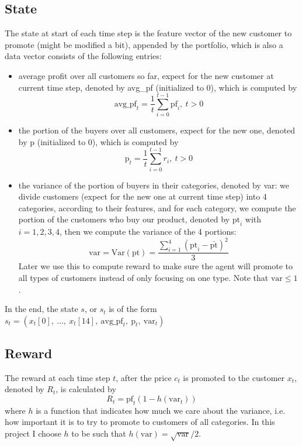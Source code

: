 \documentclass[11pt]{article}
\begin{document}
\subsection{State}
The state at start of each time step is the feature vector of the new customer 
to promote (might be modified a bit), appended by the portfolio, which is also 
a data vector consists of the following entries:
\begin{itemize}
    \item average profit over all customers so far, expect for the new customer
        at current time step, denoted by avg\_pf (initialized to \(0\)), 
        which is computed by
        \[\text{avg\_pf}_t = \frac{1}{t}\sum_{i=0}^{t-1} \text{pf}_i, \:t>0\]
    \item the portion of the buyers over all customers, expect for the new one,
        denoted by p (initialized to 0), which is computed by
        \[\text{p}_t=\frac{1}{t}\sum_{i=0}^{t-1} r_i, \:t>0\]
    \item the variance of the portion of buyers in their categories, denoted 
        by var: we divide customers (expect for the new one at current time 
        step) into 4 categories, according to their features, and for each 
        category, we compute the portion of the customers who buy our product,
        denoted by \(\text{pt}_i\) with \(i=1, 2, 3, 4\), then we compute the 
        variance of the 4 portions:
        \[\text{var}=\text{Var}(\text{pt})=\frac{\sum_{i=1}^{4} 
        \left(\text{pt}_i-\bar{\text{pt}}\right)^2}{3}\]
        Later we use this to compute reward to 
        make sure the agent will promote to all types of customers instead of 
        only focusing on one type.
        \vspace{2mm}\newline Note that \(\text{var}\leq1\).
\end{itemize}
In the end, the state \(s\), or \(s_t\) is of the form 
\(s_t=(x_t[0],\:\dots,\:x_t[14],\:\text{avg\_pf}_t,\:\text{p}_t,
\:\text{var}_t)\)

\subsection{Reward}
The reward at each time step \(t\), after the price \(c_t\) is promoted to the 
customer \(x_t\), denoted by \(R_t\), is calculated by
\[R_t = \text{pf}_t\left(1-h(\text{var}_t)\right)\]
where \(h\) is a function that indicates how much we care about the variance,
i.e. how important it is to try to promote to customers of all categories. In
this project I choose \(h\) to be such that 
\(h(\text{var}) = \sqrt{\text{var}}/2\).
\end{document}

